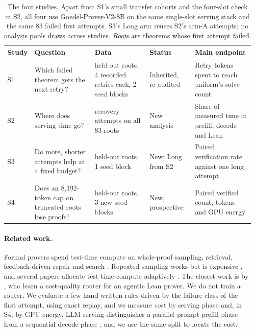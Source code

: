\begin{table}[t]
\caption{The four studies.  Apart from S1's small transfer cohorts and the four-slot check in S2, all four use Goedel-Prover-V2-8B on the same single-slot serving stack and the same 83 failed first attempts.  S3's Long arm reuses S2's arm-A attempts; no analysis pools draws across studies.  \emph{Roots} are theorems whose first attempt failed.}
\label{tab:studies}
\centering\small
\begin{tabularx}{\linewidth}{@{}l>{\raggedright\arraybackslash}X>{\raggedright\arraybackslash}Xl>{\raggedright\arraybackslash}X@{}}
\toprule
Study & Question & Data & Status & Main endpoint \\
\midrule
S1 & Which failed theorem gets the next retry? & 40 held-out roots, 4 recorded retries each, 2 seed blocks & Inherited, re-audited & Retry tokens spent to reach uniform's solve count \\
S2 & Where does serving time go? & \AllBranches{} recovery attempts on all 83 roots & New analysis & Share of measured time in prefill, decode and Lean \\
S3 & Do more, shorter attempts help at a fixed budget? & 40 held-out roots, 1 seed block & New; Long from S2 & Paired verification rate against one long attempt \\
S4 & Does an 8,192-token cap on truncated roots lose proofs? & 40 held-out roots, 3 new seed blocks & New, prospective & Paired verified count; tokens and GPU energy \\
\bottomrule
\end{tabularx}
\end{table}

\paragraph{Related work.}
Formal provers spend test-time compute on whole-proof sampling, retrieval, feedback-driven repair and search \citep{first2023baldur,yang2023leandojo,thakur2024copra,lin2025goedel,ren2025deepseekproverv2,wang2025kimina,ma2026oprover}.  Repeated sampling works but is expensive \citep{brown2024monkeys}, and several papers allocate test-time compute adaptively \citep{snell2024scaling,alomrani2025budget,zuo2025bandit,wang2025rollout,damani2025think,zhai2026adaptive}.  The closest work is by \citet{rognvaldsson2026cost}, who learn a cost-quality router for an agentic Lean prover.  We do not train a router.  We evaluate a few hand-written rules driven by the failure class of the first attempt, using exact replay, and we measure cost by serving phase and, in S4, by GPU energy.  LLM serving distinguishes a parallel prompt-prefill phase from a sequential decode phase \citep{agrawal2023sarathi,kwon2023vllm}, and we use the same split to locate the cost.

